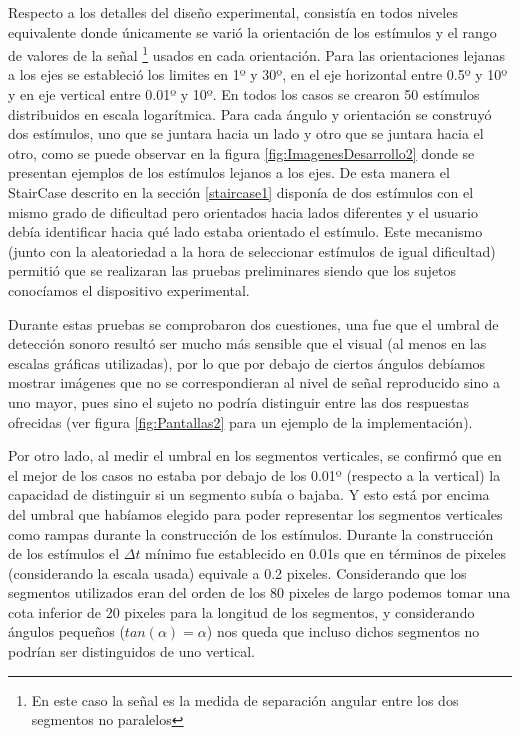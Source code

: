 \documentclass{article}
\numberwithin{figure}{section}
\begin{document}
    Respecto a los detalles del diseño experimental, consistía en todos niveles equivalente donde únicamente se varió la orientación de los estímulos y el rango de valores de la señal \footnote{En este caso la señal es la medida de separación angular entre los dos segmentos no paralelos} usados en cada orientación. Para las orientaciones lejanas a los ejes se estableció los limites en 1º y 30º, en el eje horizontal entre 0.5º y 10º y en eje vertical entre 0.01º y 10º. En todos los casos se crearon 50 estímulos distribuidos en escala logarítmica. Para cada ángulo y orientación se construyó dos estímulos, uno que se juntara hacia un lado y otro que se juntara hacia el otro, como se puede observar en la figura \ref{fig:ImagenesDesarrollo2} donde se presentan ejemplos de los estímulos lejanos a los ejes. De esta manera el StairCase descrito en la sección \ref{staircase1} disponía de dos estímulos con el mismo grado de dificultad pero orientados hacia lados diferentes y el usuario debía identificar hacia qué lado estaba orientado el estímulo. Este mecanismo (junto con la aleatoriedad a la hora de seleccionar estímulos de igual dificultad) permitió que se realizaran las pruebas preliminares siendo que los sujetos conocíamos el dispositivo experimental.
    
    Durante estas pruebas se comprobaron dos cuestiones, una fue que el umbral de detección sonoro resultó ser mucho más sensible que el visual (al menos en las escalas gráficas utilizadas), por lo que por debajo de ciertos ángulos debíamos mostrar imágenes que no se correspondieran al nivel de señal reproducido sino a uno mayor, pues sino el sujeto no podría distinguir entre las dos respuestas ofrecidas (ver figura \ref{fig:Pantallas2} para un ejemplo de la implementación). 
    
    Por otro lado, al medir el umbral en los segmentos verticales, se confirmó que en el mejor de los casos no estaba por debajo de los 0.01º (respecto a la vertical) la capacidad de distinguir si un segmento subía o bajaba. Y esto está por encima del umbral que habíamos elegido para poder representar los segmentos verticales como rampas durante la construcción de los estímulos. Durante la construcción de los estímulos el $\Delta t$ mínimo fue establecido en 0.01s que en términos de pixeles (considerando la escala usada) equivale a 0.2 pixeles. Considerando que los segmentos utilizados eran del orden de los 80 pixeles de largo podemos tomar una cota inferior de 20 pixeles para la longitud de los segmentos, y considerando ángulos pequeños ($tan(\alpha)=\alpha$) nos queda que incluso dichos segmentos no podrían ser distinguidos de uno vertical.
    
\end{document}
